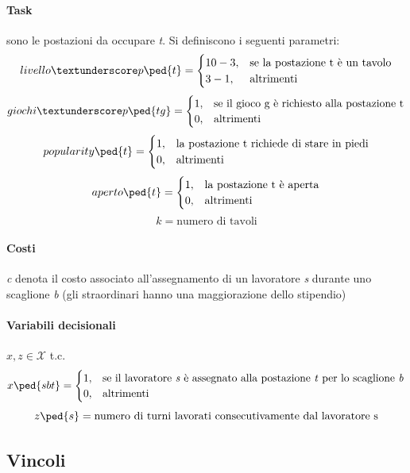 \paragraph{Task} sono le postazioni da occupare \textit{t}.  Si definiscono i seguenti parametri:
\[
livello\textunderscore p\ped{t} = \begin{cases}
10-3,& \text{se la postazione t è un tavolo}  \\
3-1,& \text{altrimenti} 
\end{cases}
\]
\[
giochi\textunderscore p\ped{tg} = \begin{cases}
1,& \text{se il gioco g è richiesto alla postazione t}  \\
0,& \text{altrimenti}
\end{cases}
\]
\[
popularity\ped{t} = \begin{cases}
1,& \text{la postazione t richiede di stare in piedi}  \\
0,& \text{altrimenti}
\end{cases}
\]
\[
aperto\ped{t} = \begin{cases}
1,& \text{la postazione t è aperta}  \\
0,& \text{altrimenti}
\end{cases}
\]
\[
k = \text{numero di tavoli}
\]
\paragraph{Costi} \textit{c} denota il costo associato all'assegnamento di un lavoratore \textit{s} durante uno scaglione \textit{b} (gli straordinari hanno una maggiorazione dello stipendio)
\paragraph{Variabili decisionali} $x,z \in \mathcal{X}$ t.c.
\[
x\ped{sbt} = \begin{cases}
1,& \text{se il lavoratore \textit{s} è assegnato alla postazione \textit{t} per lo scaglione \textit{b}}  \\
0,& \text{altrimenti}
\end{cases}
\]
\[
z\ped{s} = \text{numero di turni lavorati consecutivamente dal lavoratore s}
\]
\subsection{Vincoli}
